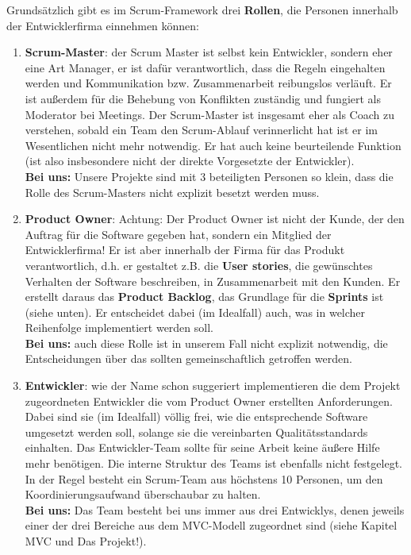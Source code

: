\documentclass{article}
\begin{document}
Grundsätzlich gibt es im Scrum-Framework drei \textbf{Rollen}, die Personen innerhalb der Entwicklerfirma einnehmen können:
\begin{enumerate}
    \item \textbf{Scrum-Master}: der Scrum Master ist selbst kein Entwickler, sondern eher eine Art Manager, er ist dafür verantwortlich, dass die Regeln eingehalten werden und Kommunikation bzw. Zusammenarbeit reibungslos verläuft. Er ist außerdem für die Behebung von Konflikten zuständig und fungiert als Moderator bei Meetings. Der Scrum-Master ist insgesamt eher als Coach zu verstehen, sobald ein Team den Scrum-Ablauf verinnerlicht hat ist er im Wesentlichen nicht mehr notwendig. Er hat auch keine beurteilende Funktion (ist also insbesondere nicht der direkte Vorgesetzte der Entwickler). \\
    \color{purp} \textbf{Bei uns:} \color{black} Unsere Projekte sind mit 3 beteiligten Personen so klein, dass die Rolle des Scrum-Masters nicht explizit besetzt werden muss. 
    \item \textbf{Product Owner}: \color{re} Achtung: \color{black} Der Product Owner ist nicht der Kunde, der den Auftrag für die Software gegeben hat, sondern ein Mitglied der Entwicklerfirma! Er ist aber innerhalb der Firma für das Produkt verantwortlich, d.h. er gestaltet z.B. die \textbf{User stories}, die gewünschtes Verhalten der Software beschreiben, in Zusammenarbeit mit den Kunden. Er erstellt daraus das \textbf{Product Backlog}, das Grundlage für die \textbf{Sprints} ist (siehe unten). Er entscheidet dabei (im Idealfall) auch, was in welcher Reihenfolge implementiert werden soll. \\
    \color{purp} \textbf{Bei uns:} \color{black} auch diese Rolle ist in unserem Fall nicht explizit notwendig, die Entscheidungen über das  sollten gemeinschaftlich getroffen werden. 
    \item \textbf{Entwickler}: wie der Name schon suggeriert implementieren die dem Projekt zugeordneten Entwickler die vom Product Owner erstellten Anforderungen. Dabei sind sie (im Idealfall) völlig frei, wie die entsprechende Software umgesetzt werden soll, solange sie die vereinbarten Qualitätsstandards einhalten. Das Entwickler-Team sollte für seine Arbeit keine äußere Hilfe mehr benötigen. Die interne Struktur des Teams ist ebenfalls nicht festgelegt. In der Regel besteht ein Scrum-Team  aus höchstens 10 Personen, um den Koordinierungsaufwand überschaubar zu halten. \\
    \color{purp} \textbf{Bei uns:} \color{black} Das Team besteht bei uns immer aus drei Entwicklys, denen jeweils einer der drei Bereiche aus dem MVC-Modell zugeordnet sind (siehe Kapitel MVC und Das Projekt!).
\end{enumerate}
\end{document}
